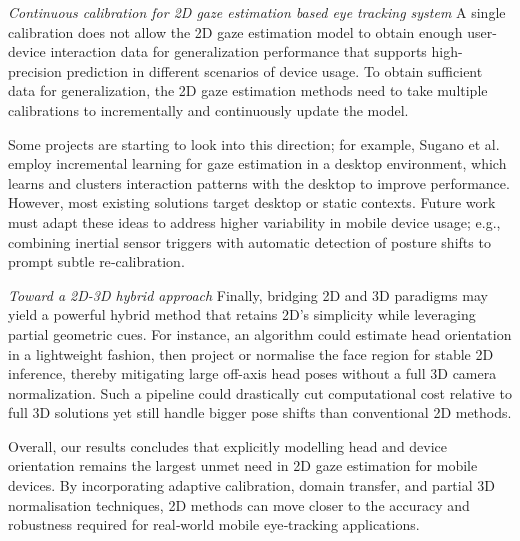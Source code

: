 \noindent\textit{Continuous calibration for 2D gaze estimation based eye tracking system} 
A single calibration does not allow the 2D gaze estimation model to obtain enough user-device interaction data for generalization performance that supports high-precision prediction in different scenarios of device usage. To obtain sufficient data for generalization, the 2D gaze estimation methods need to take multiple calibrations to incrementally and continuously update the model. 


Some projects are starting to look into this direction; for example, Sugano et al.~\cite{Sugano08Incremental} employ incremental learning for gaze estimation in a desktop environment, which learns and clusters interaction patterns with the desktop to improve performance. However, most existing solutions target desktop or static contexts. Future work must adapt these ideas to address higher variability in mobile device usage; e.g., combining inertial sensor triggers with automatic detection of posture shifts to prompt subtle re‐calibration.


\noindent\textit{Toward a 2D-3D hybrid approach}
Finally, bridging 2D and 3D paradigms may yield a powerful hybrid method that retains 2D’s simplicity while leveraging partial geometric cues. For instance, an algorithm could estimate head orientation in a lightweight fashion, then project or normalise the face region for stable 2D inference, thereby mitigating large off-axis head poses without a full 3D camera normalization. Such a pipeline could drastically cut computational cost relative to full 3D solutions yet still handle bigger pose shifts than conventional 2D methods.

Overall, our results concludes that explicitly modelling head and device orientation remains the largest unmet need in 2D gaze estimation for mobile devices. By incorporating adaptive calibration, domain transfer, and partial 3D normalisation techniques, 2D methods can move closer to the accuracy and robustness required for real‐world mobile eye‐tracking applications.




